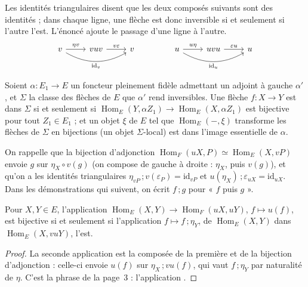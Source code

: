 Les identités triangulaires disent que les deux composés suivants sont des identités ; dans chaque ligne, une flèche est donc inversible si et seulement si l'autre l'est. L'énoncé ajoute le passage d'une ligne à l'autre.
\[
\begin{tikzcd}
v \arrow[r, "\eta v"] \arrow[rr, bend right=30, "\mathrm{id}_v"'] & vuv \arrow[r, "v\varepsilon"] & v
\end{tikzcd}
\qquad\qquad
\begin{tikzcd}
u \arrow[r, "u\eta"] \arrow[rr, bend right=30, "\mathrm{id}_u"'] & uvu \arrow[r, "\varepsilon u"] & u
\end{tikzcd}
\]

\begin{enonce}
Soient $\alpha : E_1 \to E$ un foncteur pleinement fidèle admettant un adjoint à gauche $\alpha'$, et $\Sigma$ la classe des flèches de $E$ que $\alpha'$ rend inversibles. Une flèche $f : X \to Y$ est dans $\Sigma$ si et seulement si $\operatorname{Hom}_E(Y, \alpha Z_1) \to \operatorname{Hom}_E(X, \alpha Z_1)$ est bijective pour tout $Z_1 \in E_1$ ; et un objet $\xi$ de $E$ tel que $\operatorname{Hom}_E(-, \xi)$ transforme les flèches de $\Sigma$ en bijections (un objet $\Sigma$-local) est dans l'image essentielle de $\alpha$.
\end{enonce}

On rappelle que la bijection d'adjonction $\operatorname{Hom}_F(uX, P) \simeq \operatorname{Hom}_E(X, vP)$ envoie $g$ sur $\eta_X \circ v(g)$ (on compose de gauche à droite : $\eta_X$, puis $v(g)$), et qu'on a les identités triangulaires $\eta_{vP}\,;v(\varepsilon_P) = \mathrm{id}_{vP}$ et $u(\eta_X)\,;\varepsilon_{uX} = \mathrm{id}_{uX}$. Dans les démonstrations qui suivent, on écrit $f\,;g$ pour « $f$ puis $g$ ».

\begin{lemme}\label{lem:161-1-hom}
Pour $X, Y \in E$, l'application $\operatorname{Hom}_E(X, Y) \to \operatorname{Hom}_F(uX, uY)$, $f \mapsto u(f)$, est bijective si et seulement si l'application $f \mapsto f\,;\eta_Y$, de $\operatorname{Hom}_E(X, Y)$ dans $\operatorname{Hom}_E(X, vuY)$, l'est.
\end{lemme}

\begin{proof}
La seconde application est la composée de la première et de la bijection d'adjonction : celle-ci envoie $u(f)$ sur $\eta_X\,;vu(f)$, qui vaut $f\,;\eta_Y$ par naturalité de $\eta$. C'est la phrase de la page~3 : l'application .
\end{proof}

